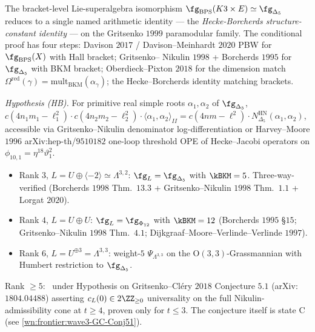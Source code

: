 \begin{theorem}
\label{wn:thm:wave3-gBPS-gDelta5}\ClaimStatusConjectured
The bracket-level Lie-superalgebra isomorphism
$\fg_{\mathrm{BPS}}(K3\times E) \simeq \fg_{\Delta_5}$ reduces to a single
named arithmetic identity --- the \emph{Hecke-Borcherds structure-constant
identity} --- on the Gritsenko $1999$ paramodular family. The
conditional proof has four steps: Davison $2017$ / Davison--Meinhardt
$2020$ PBW for $\fg_{\mathrm{BPS}}(X)$ with Hall bracket; Gritsenko--
Nikulin $1998$ + Borcherds $1995$ for $\fg_{\Delta_5}$ with BKM
bracket; Oberdieck--Pixton $2018$ for the dimension match
$\Omega^{\mathrm{red}}(\gamma) = \mathrm{mult}_{\mathrm{BKM}}(\alpha_\gamma)$;
the Hecke--Borcherds identity matching brackets.

\emph{Hypothesis (HB).} For primitive real simple roots $\alpha_1,
\alpha_2$ of $\fg_{\Delta_5}$,
$c(4n_1 m_1 - \ell_1^2) \cdot c(4n_2 m_2 - \ell_2^2)
\cdot \langle\alpha_1, \alpha_2\rangle_{II}
= c(4nm - \ell^2) \cdot N^{\mathrm{HN}}_{\Delta_5}(\alpha_1, \alpha_2)$,
accessible via Gritsenko--Nikulin denominator log-differentiation
or Harvey--Moore $1996$ arXiv:hep-th/$9510182$ one-loop threshold
OPE of Hecke--Jacobi operators on $\phi_{10, 1} = \eta^{18}\vartheta_1^2$.
\end{theorem}

\begin{theorem}
\label{wn:thm:wave3-rankge3}\ClaimStatusTheorem
\begin{itemize}
\item Rank $3$, $L = U \oplus \langle -2\rangle \simeq \Lambda^{3, 2}$:
$\fg_L = \fg_{\Delta_5}$ with $\kBKM = 5$. Three-way-verified
(Borcherds $1998$ Thm.~$13.3$ + Gritsenko--Nikulin $1998$ Thm.~$1.1$ +
Lorgat $2020$).
\item Rank $4$, $L = U \oplus U$: $\fg_L = \fg_{\Phi_{12}}$
with $\kBKM = 12$ (Borcherds $1995$ \S$15$;
Gritsenko--Nikulin $1998$ Thm.~$4.1$;
Dijkgraaf--Moore--Verlinde--Verlinde $1997$).
\item Rank $6$, $L = U^{\oplus 3} = \Lambda^{3, 3}$: weight-$5$
$\Psi_{\Lambda^{3,3}}$ on the $\mathrm{O}(3, 3)$-Grassmannian with
Humbert restriction to $\fg_{\Delta_5}$.
\end{itemize}

Rank $\geq 5$: \ClaimStatusConjectured\ under Hypothesis on
Gritsenko--Cl\'ery $2018$ Conjecture $5.1$ (arXiv:$1804.04488$)
asserting $c_L(0) \in 2\ZZ_{\geq 0}$ universality on the full
Nikulin-admissibility cone at $t \geq 4$, proven only for $t \leq 3$.
The conjecture itself is state C (see
\ref{wn:frontier:wave3-GC-Conj51}).
\end{theorem}


